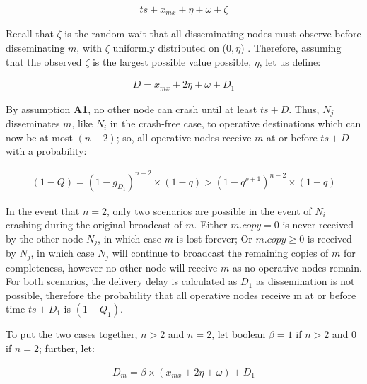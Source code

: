         \begin{equation*}
		    \begin{aligned}
		        ts+ x_{mx} + \eta + \omega +\zeta
		    \end{aligned}
		\end{equation*}
		
Recall that $\zeta$ is the random wait that all disseminating nodes must observe before disseminating $m$, with $\zeta$ uniformly distributed on ($0, \eta$) .  Therefore, assuming that the observed $\zeta$ is the largest possible value possible, $\eta$, let us define: 

        \begin{equation*}
		    \begin{aligned}
		        D = x_{mx} + 2\eta + \omega + D_1
		    \end{aligned}
		\end{equation*}
		
By assumption \textbf{A1}, no other node can crash until at least $ts+D$. Thus, $N_j$ disseminates $m$, like $N_i$ in the crash-free case, to operative destinations which can now be at most $(n-2)$; so, all operative nodes receive $m$ at or before $ts +D$ with a probability: 
        
        \begin{equation*}
		    \begin{aligned}
		        (1-Q) = (1-g_{D_1})^{n-2}\times (1-q)>(1-q^{\rho+1})^{n-2}\times(1-q)
		    \end{aligned}
		\end{equation*}

In the event that $n = 2$, only two scenarios are possible in the event of $N_i$ crashing during the original broadcast of $m$.  Either $m.copy = 0$ is never received by the other node $N_j$, in which case $m$ is lost forever; Or $m.copy \geq 0$ is received by $N_j$, in which case $N_j$ will continue to broadcast the remaining copies of $m$ for completeness, however no other node will receive $m$ as no operative nodes remain.  For both scenarios, the delivery delay is calculated as $D_1$ as dissemination is not possible, therefore the probability that all operative nodes receive m at or before time $ts+D_1$ is $(1-Q_1)$.  

To put the two cases together, $n > 2$ and $n = 2$, let boolean $\beta = 1$ if $n>2$ and $0$ if $n=2$; further, let: 

        \begin{equation*}
		    \begin{aligned}
		        D_m=\beta\times(x_{mx}+2\eta+\omega)+D_1
		    \end{aligned}
		\end{equation*}
		
